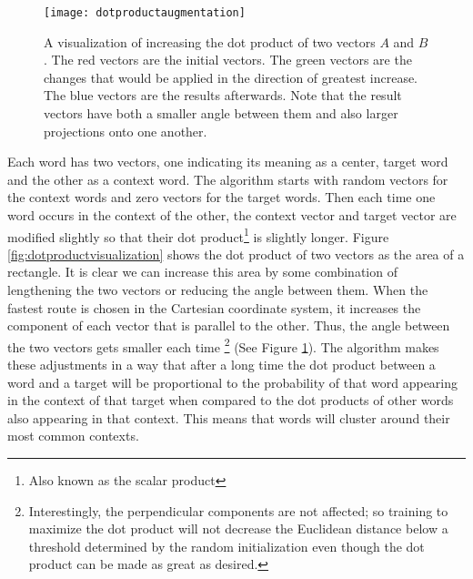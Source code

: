 \begin{figure}[tbp]
  \texttt{[image: dotproductaugmentation]}
  \caption{A visualization of increasing the dot product of two vectors $A$ and 
  $B$. The red vectors are the initial vectors. The green vectors are the 
  changes that would be applied in the direction of greatest increase. The blue
  vectors are the results afterwards. Note that the result vectors have both a 
  smaller angle between them and also larger projections onto one another.}
  \label{fig:dotproductaugmentation}
\end{figure}

Each word has two vectors, one indicating its meaning as a center, target word 
and the other as a context word. The algorithm starts with random vectors for 
the context words and zero vectors for the target words. Then 
each time one word occurs in the context of the other, the context vector and 
target vector are modified slightly so that their dot product\footnote{Also 
known as the scalar product} is slightly longer. Figure 
\ref{fig:dotproductvisualization} shows the dot product of two vectors as the 
area of a rectangle. It is clear we can increase this area by some combination 
of lengthening the two vectors or reducing the angle between them. 
When the fastest route is chosen in the Cartesian coordinate system, it
increases the component of each vector that is parallel to the other. Thus, the
angle between the two vectors gets smaller each time
\footnote{Interestingly, the perpendicular components are not affected; so 
training to maximize the dot product will not decrease the Euclidean distance
below a threshold determined by the random initialization even though the
dot product can be made as great as desired.} (See Figure 
\ref{fig:dotproductaugmentation}).
The algorithm 
makes these adjustments in a way that after a long time the dot product
between a word and a target will be proportional to the probability of that word 
appearing in the context of that target when compared to the dot products of
other words also appearing in that context. This means that words will cluster
around their most common contexts.


